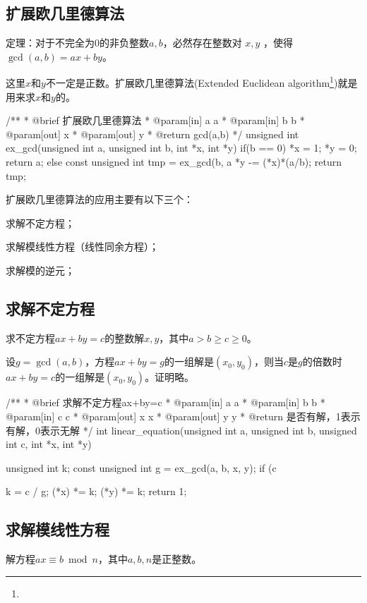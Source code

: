 \subsection{扩展欧几里德算法}
定理：对于不完全为$0$的非负整数$a,b$，必然存在整数对 $x,y$ ，使得 $\gcd(a,b)=ax+by$。

这里$x$和$y$不一定是正数。扩展欧几里德算法(Extended Euclidean algorithm\footnote{})就是用来求$x$和$y$的。

\begin{Codex}[label=ex_gcd.c]
/**
 * @brief 扩展欧几里德算法
 * @param[in] a a
 * @param[in] b b
 * @param[out] x
 * @param[out] y
 * @return gcd(a,b)
 */
unsigned int ex_gcd(unsigned int a, unsigned int b, int *x, int *y) {
    if(b == 0) {
        *x = 1; *y = 0; return a;
    } else {
        const unsigned int tmp = ex_gcd(b, a %
        *y -= (*x)*(a/b);
        return tmp;
    }
}
\end{Codex}

扩展欧几里德算法的应用主要有以下三个：
\begindot
\item 求解不定方程；
\item 求解模线性方程（线性同余方程）；
\item 求解模的逆元；
\myenddot


\subsection{求解不定方程}
求不定方程$ax+by=c$的整数解$x,y$，其中$a > b \geq c \geq 0$。

设$g=\gcd(a,b)$，方程$ax+by=g$的一组解是$(x_0,y_0)$，则当$c$是$g$的倍数时$ax+by=c$的一组解是$(x_0,y_0)$。证明略。

\begin{Code}
/**
 * @brief 求解不定方程ax+by=c
 * @param[in] a a
 * @param[in] b b
 * @param[in] c c
 * @param[out] x x
 * @param[out] y y
 * @return 是否有解，1表示有解，0表示无解
 */
int linear_equation(unsigned int a, unsigned int b, unsigned int c,
        int *x, int *y) {
    unsigned int k;
    const unsigned int g = ex_gcd(a, b, x, y);
    if (c %

    k = c / g;
    (*x) *= k; (*y) *= k;
    return 1;
}
\end{Code}


\subsection{求解模线性方程}
解方程$ax \equiv b\bmod n$，其中$a,b,n$是正整数。

